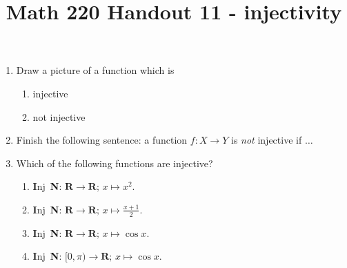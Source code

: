 \documentclass[12pt, reqno]{amsart}
\begin{document}
\title[Math 220 Handout 11 - injectivity and surjectivity warmup]{Math 220 Handout 11 - injectivity}\maketitle





\begin{enumerate}

\item Draw a picture of a function which is 
  \begin{enumerate}
  \item injective\vspace{3cm}
  \item not injective\vspace{3cm}
  \end{enumerate}

\item Finish the following sentence: a function $f\colon X \to Y$ is
  \emph{not} injective if $\ldots$\\ \vspace{3cm}





\newpage
\item Which of the following functions are injective?\vspace{22pt}


  \begin{enumerate}
  \item \textbf{I}nj\,  \textbf{N}:
    \hspace{12pt}
$\mathbf{R} \to \mathbf{R};\, x \mapsto x^2$.
\vspace{22pt}

  \item \textbf{I}nj\,  \textbf{N}:
    \hspace{12pt}
$\mathbf{R} \to \mathbf{R};\, x \mapsto \frac{x+1}{2}$.
\vspace{22pt}

  \item \textbf{I}nj\,  \textbf{N}:
    \hspace{12pt}
$\mathbf{R} \to \mathbf{R};\, x \mapsto \cos{x}$.
\vspace{22pt}

  \item \textbf{I}nj\,  \textbf{N}:
    \hspace{12pt}
$[0,\pi) \to \mathbf{R};\, x \mapsto \cos{x}$.
\vspace{22pt}



\end{enumerate}
\end{enumerate}
\end{document}
